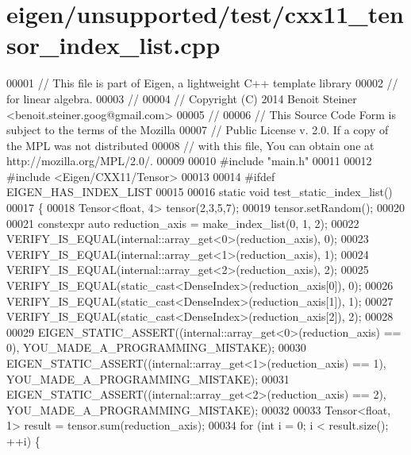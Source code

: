 \hypertarget{eigen_2unsupported_2test_2cxx11__tensor__index__list_8cpp_source}{}\section{eigen/unsupported/test/cxx11\+\_\+tensor\+\_\+index\+\_\+list.cpp}
\label{eigen_2unsupported_2test_2cxx11__tensor__index__list_8cpp_source}

\begin{DoxyCode}
00001 \textcolor{comment}{// This file is part of Eigen, a lightweight C++ template library}
00002 \textcolor{comment}{// for linear algebra.}
00003 \textcolor{comment}{//}
00004 \textcolor{comment}{// Copyright (C) 2014 Benoit Steiner <benoit.steiner.goog@gmail.com>}
00005 \textcolor{comment}{//}
00006 \textcolor{comment}{// This Source Code Form is subject to the terms of the Mozilla}
00007 \textcolor{comment}{// Public License v. 2.0. If a copy of the MPL was not distributed}
00008 \textcolor{comment}{// with this file, You can obtain one at http://mozilla.org/MPL/2.0/.}
00009 
00010 \textcolor{preprocessor}{#include "main.h"}
00011 
00012 \textcolor{preprocessor}{#include <Eigen/CXX11/Tensor>}
00013 
00014 \textcolor{preprocessor}{#ifdef EIGEN\_HAS\_INDEX\_LIST}
00015 
00016 \textcolor{keyword}{static} \textcolor{keywordtype}{void} test\_static\_index\_list()
00017 \{
00018   Tensor<float, 4> tensor(2,3,5,7);
00019   tensor.setRandom();
00020 
00021   constexpr \textcolor{keyword}{auto} reduction\_axis = make\_index\_list(0, 1, 2);
00022   VERIFY\_IS\_EQUAL(internal::array\_get<0>(reduction\_axis), 0);
00023   VERIFY\_IS\_EQUAL(internal::array\_get<1>(reduction\_axis), 1);
00024   VERIFY\_IS\_EQUAL(internal::array\_get<2>(reduction\_axis), 2);
00025   VERIFY\_IS\_EQUAL(static\_cast<DenseIndex>(reduction\_axis[0]), 0);
00026   VERIFY\_IS\_EQUAL(static\_cast<DenseIndex>(reduction\_axis[1]), 1);
00027   VERIFY\_IS\_EQUAL(static\_cast<DenseIndex>(reduction\_axis[2]), 2);
00028 
00029   EIGEN\_STATIC\_ASSERT((internal::array\_get<0>(reduction\_axis) == 0), YOU\_MADE\_A\_PROGRAMMING\_MISTAKE);
00030   EIGEN\_STATIC\_ASSERT((internal::array\_get<1>(reduction\_axis) == 1), YOU\_MADE\_A\_PROGRAMMING\_MISTAKE);
00031   EIGEN\_STATIC\_ASSERT((internal::array\_get<2>(reduction\_axis) == 2), YOU\_MADE\_A\_PROGRAMMING\_MISTAKE);
00032 
00033   Tensor<float, 1> result = tensor.sum(reduction\_axis);
00034   \textcolor{keywordflow}{for} (\textcolor{keywordtype}{int} i = 0; i < result.size(); ++i) \{

\end{DoxyCode}
